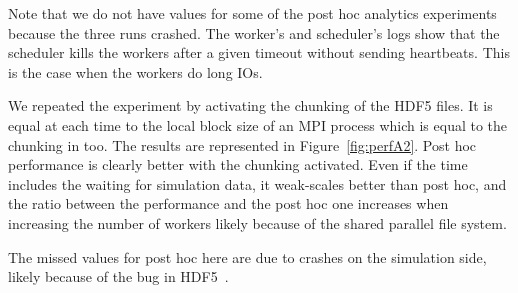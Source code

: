 Note that we do not have values for some of the post hoc analytics experiments because the three runs crashed. The worker's and scheduler's logs show that the scheduler kills the workers after a given timeout without sending heartbeats. This is the case when the workers do long IOs. 

We repeated the experiment by activating the chunking of the HDF5 files. It is equal at each time to the local block size of an MPI process which is equal to the chunking in \dask too. 
The results are represented in Figure~\ref{fig:perfA2}. Post hoc performance is clearly better with the chunking activated. 
Even if the \deisa time includes the waiting for simulation data, it weak-scales better than post hoc, and the ratio between the \deisa performance and the post hoc one increases when increasing the number of \dask workers likely because of the shared parallel file system. 

The missed values for post hoc here are due to crashes on the simulation side, likely because of the bug in HDF5~\cite{large_2023}.

